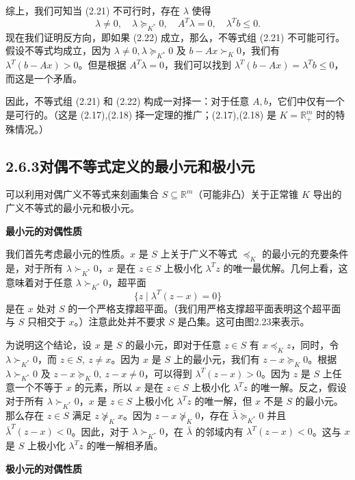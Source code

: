 \documentclass[UTF8, 12pt, fontset=fandol, oneside]{ctexart}
\begin{document}
综上，我们可知当 (2.21) 不可行时，存在 $\lambda$ 使得
\begin{equation}
  \lambda\ne0,\quad \lambda\succeq_{K^*}0,\quad A^T\lambda=0,\quad \lambda^Tb\le0.
  \tag{2.22}
\end{equation}
现在我们证明反方向，即如果 (2.22) 成立，那么，不等式组 (2.21) 不可能可行。假设不等式均成立，因为 $\lambda\ne0,\lambda\succeq_{K^*}0$ 及 $b-Ax\succ_K0$，我们有 $\lambda^T(b-Ax)>0$。但是根据 $A^T\lambda=0$，我们可以找到 $\lambda^T(b-Ax)=\lambda^Tb\le0$，而这是一个矛盾。

因此，不等式组 (2.21) 和 (2.22) 构成一对择一：对于任意 $A,b$，它们中仅有一个是可行的。（这是 (2.17),(2.18) 择一定理的推广；(2.17),(2.18) 是 $K=\mathbb{R}_+^m$ 时的特殊情况。）

\subsection*{2.6.3\quad 对偶不等式定义的最小元和极小元}

可以利用对偶广义不等式来刻画集合 $S\subseteq\mathbb{R}^m$（可能非凸）关于正常锥 $K$ 导出的广义不等式的最小元和极小元。

\noindent\textbf{最小元的对偶性质}

我们首先考虑最小元的性质。$x$ 是 $S$ 上关于广义不等式 $\preceq_K$ 的最小元的充要条件是，对于所有 $\lambda\succ_{K^*}0$，$x$ 是在 $z\in S$ 上极小化 $\lambda^Tz$ 的唯一最优解。几何上看，这意味着对于任意 $\lambda\succ_{K^*}0$，超平面
\[
  \{z\mid \lambda^T(z-x)=0\}
\]
是在 $x$ 处对 $S$ 的一个严格支撑超平面。（我们用严格支撑超平面表明这个超平面与 $S$ 只相交于 $x$。）注意此处并不要求 $S$ 是凸集。这可由图2.23来表示。

为说明这个结论，设 $x$ 是 $S$ 的最小元，即对于任意 $z\in S$ 有 $x\preceq_K z$，同时，令 $\lambda\succ_{K^*}0$，而 $z\in S,\ z\ne x$。因为 $x$ 是 $S$ 上的最小元，我们有 $z-x\succeq_K0$。根据 $\lambda\succ_{K^*}0$ 及 $z-x\succeq_K0,\ z-x\ne0$，可以得到 $\lambda^T(z-x)>0$。因为 $z$ 是 $S$ 上任意一个不等于 $x$ 的元素，所以 $x$ 是在 $z\in S$ 上极小化 $\lambda^Tz$ 的唯一解。反之，假设对于所有 $\lambda\succ_{K^*}0$，$x$ 是 $z\in S$ 上极小化 $\lambda^Tz$ 的唯一解，但 $x$ 不是 $S$ 的最小元。那么存在 $z\in S$ 满足 $z\not\succeq_K x$。因为 $z-x\not\succeq_K0$，存在 $\bar{\lambda}\succeq_{K^*}0$ 并且 $\bar{\lambda}^T(z-x)<0$。因此，对于 $\lambda\succ_{K^*}0$，在 $\bar{\lambda}$ 的邻域内有 $\lambda^T(z-x)<0$。这与 $x$ 是 $S$ 上极小化 $\lambda^Tz$ 的唯一解相矛盾。

\noindent\textbf{极小元的对偶性质}
\end{document}
